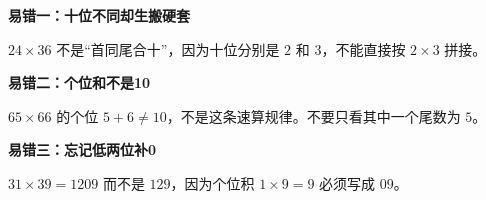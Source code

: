 \clearpage
\begin{trapbox}
\textbf{\textcolor{CTrap}{易错一：十位不同却生搬硬套}}
\par\medskip
\begin{center}

\end{center}
\medskip
$24\times36$ 不是“首同尾合十”，因为十位分别是 $2$ 和 $3$，不能直接按 $2\times3$ 拼接。
\end{trapbox}
\clearpage
\begin{trapbox}
\textbf{\textcolor{CTrap}{易错二：个位和不是10}}
\par\medskip
\begin{center}

\end{center}
\medskip
$65\times66$ 的个位 $5+6\ne10$，不是这条速算规律。不要只看其中一个尾数为 $5$。
\end{trapbox}
\clearpage
\begin{trapbox}
\textbf{\textcolor{CTrap}{易错三：忘记低两位补0}}
\par\medskip
\begin{center}

\end{center}
\medskip
$31\times39=1209$ 而不是 $129$，因为个位积 $1\times9=9$ 必须写成 $09$。
\end{trapbox}

